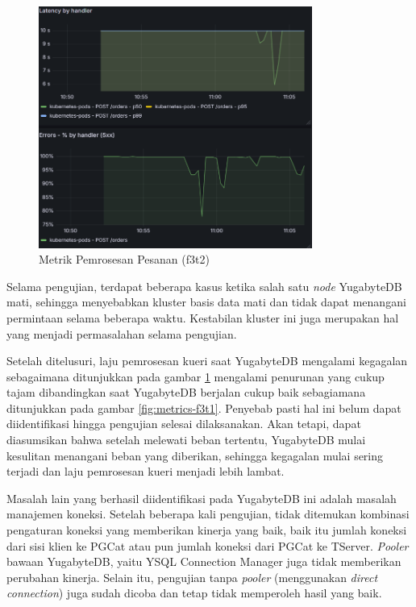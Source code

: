 \begin{figure}[htbp]
    \centering
    \includegraphics[width=0.8\textwidth]{resources/chapter-4/latensi-yugabyte-fail.png}
    \caption{Metrik Pemrosesan Pesanan (f3t2)}
    \label{fig:metrics-f3t2}
\end{figure}

Selama pengujian, terdapat beberapa kasus ketika salah satu \textit{node} YugabyteDB mati, sehingga menyebabkan kluster basis data mati dan tidak dapat menangani permintaan selama beberapa waktu. Kestabilan kluster ini juga merupakan hal yang menjadi permasalahan selama pengujian.

Setelah ditelusuri, laju pemrosesan kueri saat YugabyteDB mengalami kegagalan sebagaimana ditunjukkan pada gambar \ref{fig:metrics-f3t2} mengalami penurunan yang cukup tajam dibandingkan saat YugabyteDB berjalan cukup baik sebagiamana ditunjukkan pada gambar \ref{fig:metrics-f3t1}. Penyebab pasti hal ini belum dapat diidentifikasi hingga pengujian selesai dilaksanakan. Akan tetapi, dapat diasumsikan bahwa setelah melewati beban tertentu, YugabyteDB mulai kesulitan menangani beban yang diberikan, sehingga kegagalan mulai sering terjadi dan laju pemrosesan kueri menjadi lebih lambat.

Masalah lain yang berhasil diidentifikasi pada YugabyteDB ini adalah masalah manajemen koneksi. Setelah beberapa kali pengujian, tidak ditemukan kombinasi pengaturan koneksi yang memberikan kinerja yang baik, baik itu jumlah koneksi dari sisi klien ke PGCat atau pun jumlah koneksi dari PGCat ke TServer. \textit{Pooler} bawaan YugabyteDB, yaitu YSQL Connection Manager juga tidak memberikan perubahan kinerja. Selain itu, pengujian tanpa \textit{pooler} (menggunakan \textit{direct connection}) juga sudah dicoba dan tetap tidak memperoleh hasil yang baik.

